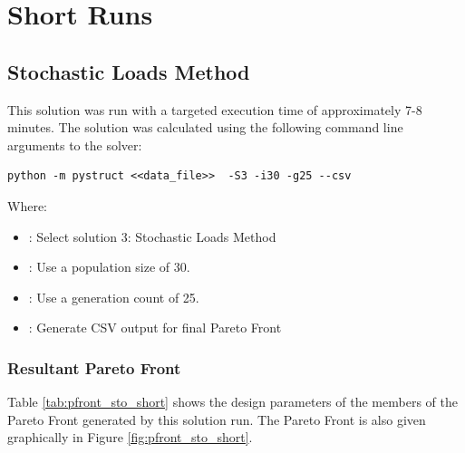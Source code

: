 \section{Short Runs}

\subsection{Stochastic Loads Method}
This solution was run with a targeted execution time of approximately 7-8 minutes. The solution was calculated using the following command line arguments to the solver: 

\begin{verbatim}
python -m pystruct <<data_file>>  -S3 -i30 -g25 --csv
\end{verbatim}

\noindent Where: 

\begin{itemize}
  \item {}: Select solution 3: Stochastic Loads Method
  \item {}: Use a population size of 30. 
  \item {}: Use a generation count of 25. 
  \item {}: Generate CSV output for final Pareto Front
\end{itemize}


\subsubsection{Resultant Pareto Front}
Table \ref{tab:pfront_sto_short} shows the design parameters of the members of the Pareto Front generated by this solution run. The Pareto Front is also given graphically in Figure \ref{fig:pfront_sto_short}. 


